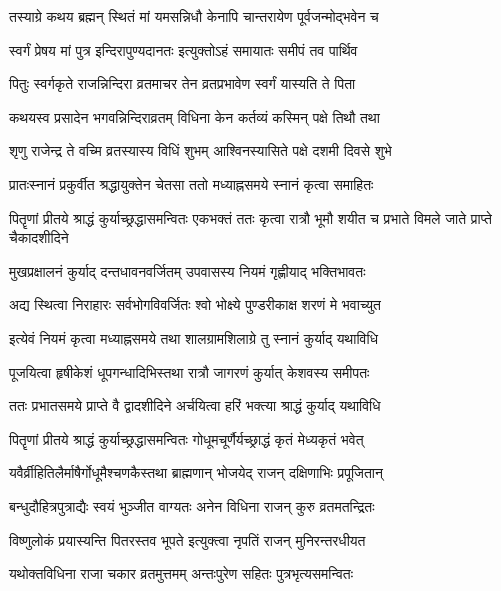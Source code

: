 \twolineshloka
{तस्याग्रे कथय ब्रह्मन् स्थितं मां यमसन्निधौ}
{केनापि चान्तरायेण पूर्वजन्मोद्भवेन च}%

\twolineshloka
{स्वर्गं प्रेषय मां पुत्र इन्दिरापुण्यदानतः}
{इत्युक्तोऽहं समायातः समीपं तव पार्थिव}%

\twolineshloka
{पितुः स्वर्गकृते राजन्निन्दिरा व्रतमाचर}
{तेन व्रतप्रभावेण स्वर्गं यास्यति ते पिता}%


\twolineshloka
{कथयस्व प्रसादेन भगवन्निन्दिराव्रतम्}
{विधिना केन कर्तव्यं कस्मिन् पक्षे तिथौ तथा}%


\twolineshloka
{शृणु राजेन्द्र ते वच्मि व्रतस्यास्य विधिं शुभम्}
{आश्विनस्यासिते पक्षे दशमी दिवसे शुभे}%

\twolineshloka
{प्रातःस्नानं प्रकुर्वीत श्रद्धायुक्तेन चेतसा}
{ततो मध्याह्नसमये स्नानं कृत्वा समाहितः}%

\threelineshloka
{पितॄणां प्रीतये श्राद्धं कुर्याच्छ्रद्धासमन्वितः}
{एकभक्तं ततः कृत्वा रात्रौ भूमौ शयीत च}
{प्रभाते विमले जाते प्राप्ते चैकादशीदिने}%

\twolineshloka
{मुखप्रक्षालनं कुर्याद् दन्तधावनवर्जितम्}
{उपवासस्य नियमं गृह्णीयाद् भक्तिभावतः}%

\twolineshloka
{अद्य स्थित्वा निराहारः सर्वभोगविवर्जितः}
{श्वो भोक्ष्ये पुण्डरीकाक्ष शरणं मे भवाच्युत}%

\twolineshloka
{इत्येवं नियमं कृत्वा मध्याह्नसमये तथा}
{शालग्रामशिलाग्रे तु स्नानं कुर्याद् यथाविधि}%

\twolineshloka
{पूजयित्वा हृषीकेशं धूपगन्धादिभिस्तथा}
{रात्रौ जागरणं कुर्यात् केशवस्य समीपतः}%

\twolineshloka
{ततः प्रभातसमये प्राप्ते वै द्वादशीदिने}
{अर्चयित्वा हरिं भक्त्या श्राद्धं कुर्याद् यथाविधि}%

\twolineshloka
{पितॄणां प्रीतये श्राद्धं कुर्याच्छ्रद्धासमन्वितः}
{गोधूमचूर्णैर्यच्छ्राद्धं कृतं मेध्यकृतं भवेत्}%

\twolineshloka
{यवैर्व्रीहितिलैर्माषैर्गोधूमैश्चणकैस्तथा}
{ब्राह्मणान् भोजयेद् राजन् दक्षिणाभिः प्रपूजितान्}%

\twolineshloka
{बन्धुदौहित्रपुत्राद्यैः स्वयं भुञ्जीत वाग्यतः}
{अनेन विधिना राजन् कुरु व्रतमतन्द्रितः}%

\twolineshloka
{विष्णुलोकं प्रयास्यन्ति पितरस्तव भूपते}
{इत्युक्त्वा नृपतिं राजन् मुनिरन्तरधीयत}%

\twolineshloka
{यथोक्तविधिना राजा चकार व्रतमुत्तमम्}
{अन्तःपुरेण सहितः पुत्रभृत्यसमन्वितः}%

